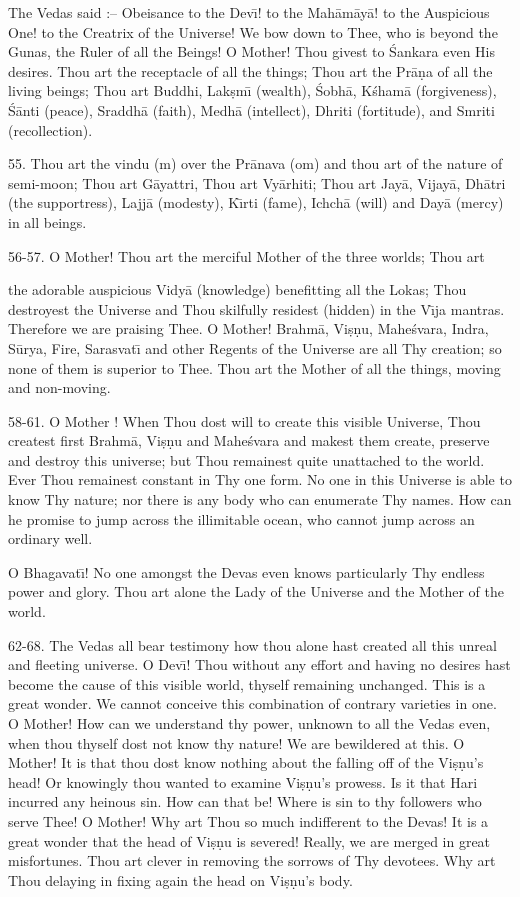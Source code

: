 The Vedas said :-- Obeisance to the Dev\={\i}! to the Mah\=am\=ay\=a! to the Auspicious One! to the Creatrix of the Universe! We bow down to Thee, who is beyond the Gunas, the Ruler of all the Beings! O Mother! Thou givest to \'Sankara even His desires. Thou art the receptacle of all the things; Thou art the Pr\=a\d{n}a of all the living beings; Thou art Buddhi, Lak\d{s}m\={\i} (wealth), \'Sobh\=a, K\'sham\=a (forgiveness), \'S\=anti (peace), Sraddh\=a (faith), Medh\=a (intellect), Dhriti (fortitude), and Smriti (recollection).

55. Thou art the vindu (m) over the Pr\=anava (om) and thou art of the nature of semi-moon; Thou art G\=ayattri, Thou art Vy\=arhiti; Thou art Jay\=a, Vijay\=a, Dh\=atri (the supportress), Lajj\=a (modesty), K\={\i}rti (fame), Ichch\=a (will) and Day\=a (mercy) in all beings.

56-57. O Mother! Thou art the merciful Mother of the three worlds; Thou art

the adorable auspicious Vidy\=a (knowledge) benefitting all the Lokas; Thou destroyest the Universe and Thou skilfully residest (hidden) in the V\={\i}ja mantras. Therefore we are praising Thee. O Mother! Brahm\=a, Vi\d{s}\d{n}u, Mahe\'svara, Indra, S\=urya, Fire, Sarasvat\={\i} and other Regents of the Universe are all Thy creation; so none of them is superior to Thee. Thou art the Mother of all the things, moving and non-moving.

58-61. O Mother ! When Thou dost will to create this visible Universe, Thou createst first Brahm\=a, Vi\d{s}\d{n}u and Mahe\'svara and makest them create, preserve and destroy this universe; but Thou remainest quite unattached to the world. Ever Thou remainest constant in Thy one form. No one in this Universe is able to know Thy nature; nor there is any body who can enumerate Thy names. How can he promise to jump across the illimitable ocean, who cannot jump across an ordinary well.

O Bhagavat\={\i}! No one amongst the Devas even knows particularly Thy endless power and glory. Thou art alone the Lady of the Universe and the Mother of the world.

62-68. The Vedas all bear testimony how thou alone hast created all this unreal and fleeting universe. O Dev\={\i}! Thou without any effort and having no desires hast become the cause of this visible world, thyself remaining unchanged. This is a great wonder. We cannot conceive this combination of contrary varieties in one. O Mother! How can we understand thy power, unknown to all the Vedas even, when thou thyself dost not know thy nature! We are bewildered at this. O Mother! It is that thou dost know nothing about the falling off of the Vi\d{s}\d{n}u's head! Or knowingly thou wanted to examine Vi\d{s}\d{n}u's prowess. Is it that Hari incurred any heinous sin. How can that be! Where is sin to thy followers who serve Thee! O Mother! Why art Thou so much indifferent to the Devas! It is a great wonder that the head of Vi\d{s}\d{n}u is severed! Really, we are merged in great misfortunes. Thou art clever in removing the sorrows of Thy devotees. Why art Thou delaying in fixing again the head on Vi\d{s}\d{n}u's body.

